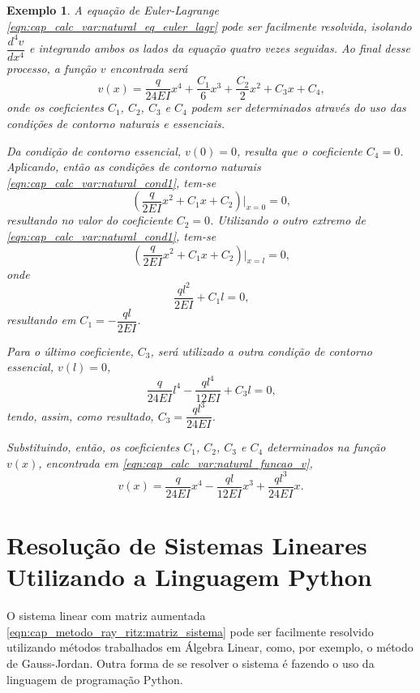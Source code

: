 \documentclass[
	12pt,				%
	openright,			%
    twoside,			%
	a4paper,			%
	english,			%
	french,				%
	spanish,			%
	brazil				%
	]{abntex2}
\newtheorem{exemplo}{Exemplo}
\numberwithin{lema}{chapter}
\numberwithin{teorema}{chapter}
\numberwithin{definicao}{chapter}
\numberwithin{exemplo}{chapter}
\numberwithin{figure}{chapter}
\begin{document}
\begin{apendicesenv}
{\begin{exemplo}
		A equação de Euler-Lagrange \eqref{eqn:cap_calc_var:natural_eq_euler_lagr} pode ser facilmente resolvida, isolando $\dfrac{d^4 v}{dx^4}$ e integrando ambos os lados da equação quatro vezes seguidas. Ao final desse processo, a função $v$ encontrada será
		\begin{equation}
			\label{eqn:cap_calc_var:natural_funcao_v}
			v(x)=\frac{q}{24EI}x^4 + \frac{C_1}{6}x^3 + \frac{C_2}{2}x^2 + C_3x + C_4
			\text{,}
		\end{equation}
		onde os coeficientes $C_1$, $C_2$, $C_3$ e $C_4$ podem ser determinados através do uso das condições de contorno naturais e essenciais.
	
		Da condição de contorno essencial, $v(0)=0$, resulta que o coeficiente $C_4=0$. Aplicando, então as condições de contorno naturais \eqref{eqn:cap_calc_var:natural_cond1}, tem-se
		$$
			\left (
				\frac{q}{2EI}x^2 + C_1x + C_2
			\right ) \Big |_{x=0}
			= 0
			\text{,}
		$$
		resultando no valor do coeficiente $C_2=0$. Utilizando o outro extremo de \eqref{eqn:cap_calc_var:natural_cond1}, tem-se
		$$
			\left (
				\frac{q}{2EI}x^2 + C_1x + C_2
			\right ) \Big |_{x=l}
			=0
			\text{,}
		$$
		onde
		$$
			\frac{ql^2}{2EI}+C_1l=0
			\text{,}
		$$
		resultando em $C_1=-\dfrac{ql}{2EI}$.
	
		Para o último coeficiente, $C_3$, será utilizado a outra condição de contorno essencial, $v(l)=0$,
		$$
			\frac{q}{24EI}l^4
			-
			\frac{ql^4}{12EI}
			+
			C_3l
			= 0
			\text{,}
		$$
		tendo, assim, como resultado, $C_3=\dfrac{ql^3}{24EI}$.
	
		Substituindo, então, os coeficientes $C_1$, $C_2$, $C_3$ e $C_4$ determinados na função $v(x)$, encontrada em \eqref{eqn:cap_calc_var:natural_funcao_v},
		$$
		v(x) = 
			\frac{q}{24EI} x^4
			-
			\frac{ql}{12EI} x^3
			+
			\frac{ql^3}{24EI} x
			\text{.}
		$$
	\end{exemplo}
}

\chapter{Resolução de Sistemas Lineares Utilizando a Linguagem Python}
\label{apend:res_sis_lin}
{
	O sistema linear com matriz aumentada \eqref{eqn:cap_metodo_ray_ritz:matriz_sistema} pode ser facilmente resolvido utilizando métodos trabalhados em Álgebra Linear, como, por exemplo, o método de Gauss-Jordan. Outra forma de se resolver o sistema é fazendo o uso da linguagem de programação Python.
	
}
\end{apendicesenv}
\end{document}
